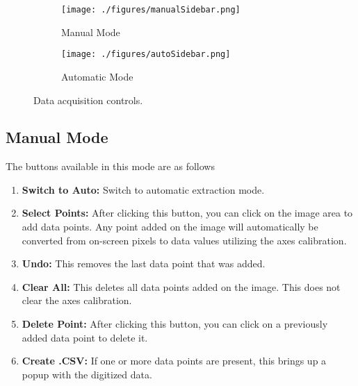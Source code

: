 \documentclass[letterpaper, 10pt]{article}
\begin{document}
\begin{figure}
\centering
{
\begin{subfigure}{0.3\textwidth}
\texttt{[image: ./figures/manualSidebar.png]}
\caption{Manual Mode}
\end{subfigure}
\begin{subfigure}{0.3\textwidth}
\texttt{[image: ./figures/autoSidebar.png]}
\caption{Automatic Mode}
\end{subfigure}
}
\caption{Data acquisition controls.}
\label{fig:acquireData}
\end{figure}

\subsection{Manual Mode}
The buttons available in this mode are as follows
\begin{enumerate}
\item{{\bf Switch to Auto: }Switch to automatic extraction mode.}
\item{{\bf Select Points: }After clicking this button, you can click on the image area to add data points. Any point added on the image will automatically be converted from on-screen pixels to data values utilizing the axes calibration.}
\item{{\bf Undo: }This removes the last data point that was added.}
\item{{\bf Clear All: }This deletes all data points added on the image. This does not clear the axes calibration.}
\item{{\bf Delete Point: }After clicking this button, you can click on a previously added data point to delete it.}
\item{{\bf Create .CSV: }If one or more data points are present, this brings up a popup with the digitized data.}
\end{enumerate}
\end{document}
